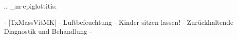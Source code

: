 %

.. _m-epiglottitis:


\begin{itemize}
    -   |TxMassVitMK|
    -   Luftbefeuchtung
    -   Kinder sitzen lassen!
    -   Zurückhaltende Diagnostik 
    und Behandlung %
    -   
\end{itemize}
